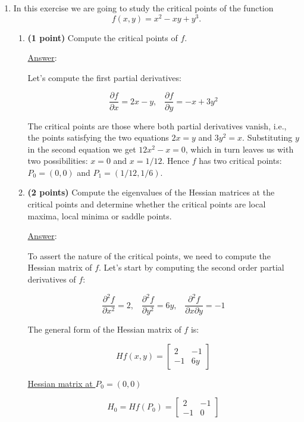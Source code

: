 \documentclass[]{book}
\theoremstyle{definition}
\newcommand\ans{\underline{Answer}: }
\begin{document}
\begin{enumerate}
\begin{enumerate}
\end{enumerate}




\item In this exercise we are going to study the critical points of the function
\[
f(x, y) = x^2 - xy + y^3.
\]

\begin{enumerate}

\item {\bf (1 point)}  Compute the critical points of $f$.

\ans

Let's compute the first partial derivatives:

\[
\frac{\partial f}{\partial x} =  2x - y, \;\;\; \frac{\partial f}{\partial y} =  -x + 3y^2
\]

The critical points are those where both partial derivatives vanish, i.e., the points satisfying the two equations $2x = y$ and $3y^2 = x$. Substituting $y$ in the second equation we get $12x^2 - x = 0$, which in turn leaves us with two possibilities: $x = 0$ and $x=1/12$. Hence $f$ has two critical points: $P_0 = (0,0)$ and $P_1=(1/12, 1/6)$.

\item {\bf (2 points)}  Compute the eigenvalues of the Hessian matrices at the critical points and determine whether the critical points are local maxima, local minima or saddle points.

\ans

To assert the nature of the critical points, we need to compute the Hessian matrix of $f$. Let's start by computing the second order partial derivatives of $f$:

\[
\frac{\partial^2 f}{\partial x^2} =  2, \;\;\; \frac{\partial^2 f}{\partial y^2} =  6y, \;\;\; \frac{\partial^2 f}{\partial x \partial y} = -1
\]

The general form of the Hessian matrix of $f$ is: 

\[
Hf(x,y) = \begin{bmatrix}
2 & -1 \\
-1 & 6y
\end{bmatrix}
\]

\vspace{1cm}

\underline{Hessian matrix at $P_0 = (0,0)$}

\[
H_0 = Hf(P_0) = \begin{bmatrix}
2 & -1 \\
-1 & 0
\end{bmatrix}
\]


\end{enumerate}
\end{enumerate}
\end{document}
